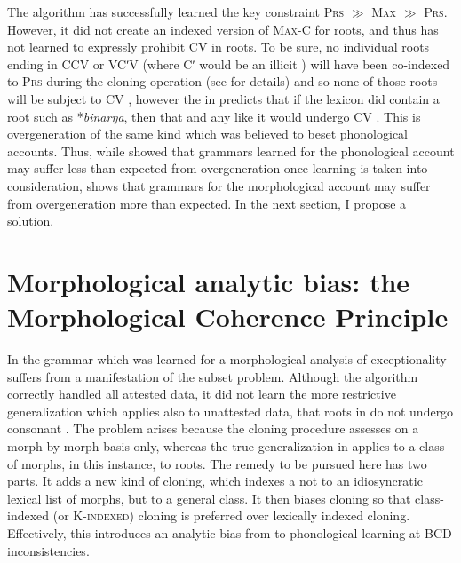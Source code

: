 \documentclass[output=paper,
modfonts
]{LSP/langsci}
\begin{document}
The algorithm has successfully learned the key constraint  \textsc{Prs}\textit{} ${\gg}$ \textsc{Max} \textsc{${\gg}$}\textsc{} \textsc{Prs}. However, it did not create an indexed version of \textsc{Max-C} for roots, and thus has not learned to expressly prohibit CV  in roots. To be sure, no individual roots ending in CCV or VCʹV (where Cʹ would be an illicit ) will have been co-indexed to \textsc{Prs}\textit{} during the cloning operation (see  for details) and so none of those roots will be subject to CV , however the  in  predicts that if the lexicon did contain a root such as *\textit{binarŋa}, then that  and any like it would undergo CV . This is overgeneration of the same kind which was believed to beset phonological accounts. Thus, while  showed that grammars learned for the phonological account may suffer less than expected from overgeneration once learning is taken into consideration,  shows that grammars for the morphological account may suffer from overgeneration more than expected. In the next section, I propose a solution.

\section[Morphological analytic bias: the Morphological Coherence Principle]{Morphological analytic bias: the Morphological Coherence Principle}\label{sec:round:6}
\label{bkm:Ref336973523}\label{bkm:Ref335232765}
In  the grammar which was learned for a morphological analysis of  exceptionality suffers from a manifestation of the subset problem. Although the algorithm correctly handled all attested data, it did not learn the more restrictive generalization which applies also to unattested data, that roots in  do not undergo consonant . The problem arises because the cloning procedure assesses  on a morph-by-morph basis only, whereas the true generalization in  applies to a class of morphs, in this instance, to roots. The remedy to be pursued here has two parts. It adds a new kind of  cloning, which indexes a  not to an idiosyncratic lexical list of morphs, but to a general class. It then biases  cloning so that class-indexed (or \textsc{K-indexed}) cloning is preferred over lexically indexed cloning. Effectively, this introduces an analytic bias \citep{moreton2008r} from  to phonological learning at BCD inconsistencies. 
\end{document}
